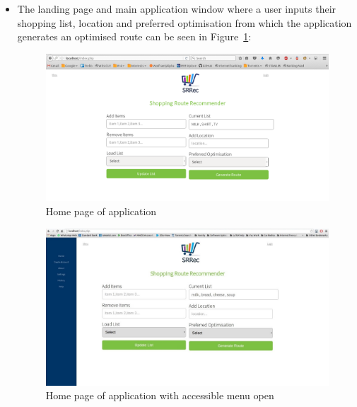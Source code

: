 \documentclass[10pt,twocolumn]{witseiepaper}
\begin{document}
\begin{itemize}
			\item The landing page and main application window where a user inputs their shopping list, location and preferred optimisation from which the application generates an optimised route can be seen in Figure~\ref{home page}:
			\begin{figure}[htbp]
				\centering
				\includegraphics[width = \columnwidth]{../images/index_new.png}
				\caption{Home page of application}
				\label{home page}
			\end{figure}
			
			\begin{figure}[h!]
				\centering
				\includegraphics[width = \columnwidth]{../images/home_page_with_menu.jpg}
				\caption{Home page of application with accessible menu open}
				\label{home page_menu}
			\end{figure}
			

\end{itemize}
\end{document}
